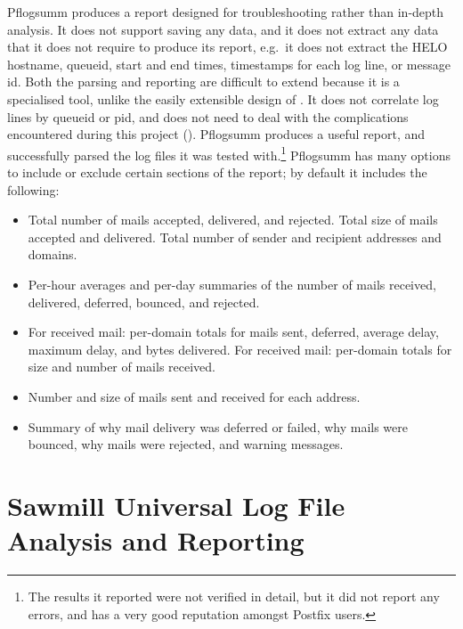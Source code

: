Pflogsumm produces a report designed for troubleshooting rather than
in-depth analysis.  It does not support saving any data, and it does not
extract any data that it does not require to produce its report, e.g.\ it
does not extract the HELO hostname, queueid, start and end times,
timestamps for each log line, or message id.  Both the parsing and
reporting are difficult to extend because it is a specialised tool, unlike
the easily extensible design of \parsername{}.  It does not correlate log
lines by queueid or \gls{pid}, and does not need to deal with the
complications encountered during this project ().
Pflogsumm produces a useful report, and successfully parsed the
\numberOFlogFILES{} log files it was tested with.\footnote{The results it reported
were not verified in detail, but it did not report any errors, and has a
very good reputation amongst Postfix users.}
Pflogsumm has many options to include or exclude certain
sections of the report; by default it includes the following:

\begin{itemize}

    \item Total number of mails accepted, delivered, and rejected.  Total
        size of mails accepted and delivered.  Total number of sender and
        recipient addresses and domains.

    \item Per-hour averages and per-day summaries of the number of mails
        received, delivered, deferred, bounced, and rejected.

    \item For received mail: per-domain totals for mails sent, deferred,
        average delay, maximum delay, and bytes delivered.  For received
        mail: per-domain totals for size and number of mails received.

    \item Number and size of mails sent and received for each address.

    \item Summary of why mail delivery was deferred or failed, why mails
        were bounced, why mails were rejected, and warning messages.

\end{itemize}

\section{Sawmill Universal Log File Analysis and Reporting}

